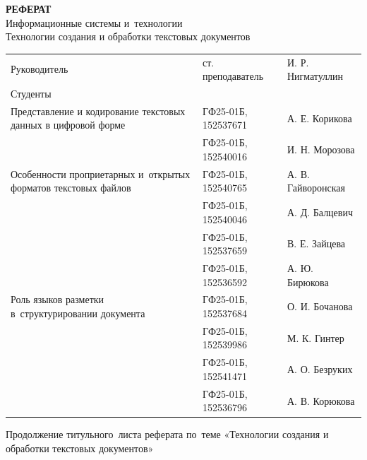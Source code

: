 \documentclass{ou}
\begin{document}
\thispagestyle{empty}
\begin{center}
\shortstack{\FGAVO}\vspace{4\baselineskip}
\textbf{РЕФЕРАТ}\\
Информационные системы и~технологии\\
Технологии создания и обработки текстовых документов\vspace{2\baselineskip}\end{center}
\begin{flushleft}
\doublespacing
\begin{tabularx}{\textwidth}{@{} p{} l l @{}}
Руководитель & ст. преподаватель & И. Р. Нигматуллин\\
Студенты     &                   &                  \\
\multirow{-2.27}{\hsize}{\singlespacing Представление и кодирование текстовых данных в цифровой форме}
             & ГФ25-01Б, 152537671 & А. Е. Корикова\\
             & ГФ25-01Б, 152540016 & И. Н. Морозова\\
\multirow{-2.27}{\hsize}{\singlespacing Особенности проприетарных и~открытых форматов текстовых файлов}
             & ГФ25-01Б, 152540765 & А. В. Гайворонская\\
             & ГФ25-01Б, 152540046 & А. Д. Балцевич\\
             & ГФ25-01Б, 152537659 & В. Е. Зайцева\\
             & ГФ25-01Б, 152536592 & А. Ю. Бирюкова\\
\multirow{-2.27}{\hsize}{\singlespacing Роль языков разметки в~структурировании документа}
             & ГФ25-01Б, 152537684 & О. И. Бочанова\\
             & ГФ25-01Б, 152539986 & М. К. Гинтер\\
             & ГФ25-01Б, 152541471 & А. О. Безруких\\
             & ГФ25-01Б, 152536796 & А. В. Корюкова\\
\end{tabularx}
\end{flushleft}
\vspace*{\fill}
\begin{center}
\city
\end{center}
\newpage
\thispagestyle{empty}
Продолжение титульного~листа реферата по~теме «Технологии создания и обработки текстовых документов»
\end{document}
